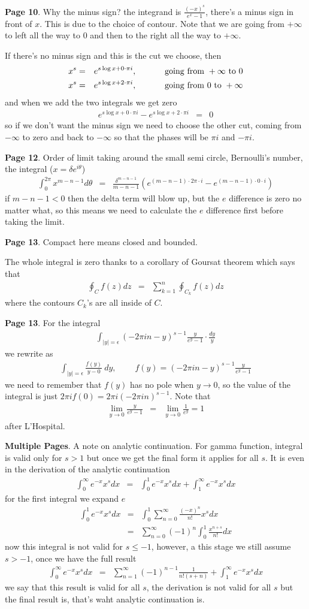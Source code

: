 \documentclass[aps,preprint,preprintnumbers,nofootinbib,showpacs,prd]{revtex4-1}
\newcommand{\nbea}{\begin{eqnarray*}}
\newcommand{\neea}{\end{eqnarray*}}
\begin{document}
{\bf Page 10}. Why the minus sign? the integrand is $\frac{(-x)^s}{e^x - 1}$, there's a minus sign in front of $x$. This is due to the choice of contour. Note that we are going from $+\infty$ to left all the way to 0 and then to the right all the way to $+\infty$.

If there's no minus sign and this is the cut we choose, then
%
\nbea
x^s & = & e^{s\log x + 0\cdot\pi i} , ~~~~~~~~~~ {\rm going~from~} +\infty {\rm ~to~} 0 \\
x^s & = & e^{s\log x + 2\cdot\pi i} , ~~~~~~~~~~ {\rm going~from~} 0 {\rm ~to~} +\infty
\neea
% 
and when we add the two integrals we get zero
%
\nbea
e^{s\log x + 0\cdot\pi i} - e^{s\log x + 2\cdot\pi i} & = & 0
\neea
%
so if we don't want the minus sign we need to choose the other cut, coming from $-\infty$ to zero and back to $-\infty$ so that the phases will be $\pi i$ and $-\pi i$.

{\bf Page 12}. Order of limit taking around the small semi circle, Bernoulli's number, the integral ($x = \delta e^{i\theta}$)
%
\nbea
\int_0^{2\pi} x^{m-n-1} d\theta & = & \frac{\delta^{m-n-1}}{m-n-1} (e^{(m-n-1) \cdot 2\pi \cdot i} - e^{(m-n-1) \cdot 0 \cdot i})
\neea
%
if $m-n-1 < 0$ then the delta term will blow up, but the $e$ difference is zero no matter what, so this means we need to calculate the $e$ difference first before taking the limit.

{\bf Page 13}. Compact here means closed and bounded.

The whole integral is zero thanks to a corollary of Goursat theorem which says that
%
\nbea
\oint_C f(z) dz & = & \sum_{k=1}^n \oint_{C_k} f(z) dz
\neea
%
where the contours $C_k$'s are all inside of $C$.

{\bf Page 13}. For the integral
%
\nbea
\int_{|y|=\epsilon} (-2\pi i n - y)^{s-1} \frac{y}{e^y - 1} \cdot \frac{dy}{y}
\neea
%
we rewrite as
%
\nbea
\int_{|y|=\epsilon} \frac{f(y)}{y - 0} ~ dy, ~~~~~~~~~~ f(y) = (-2\pi i n - y)^{s-1} \frac{y}{e^y - 1}
\neea
%
we need to remember that $f(y)$ has no pole when $y\to 0$, so the value of the integral is just $2\pi i f(0) = 2\pi i(-2\pi i n)^{s-1}$. Note that
%
\nbea
\lim_{y\to0} \frac{y}{e^y - 1} & = & \lim_{y\to0} \frac{1}{e^y} = 1
\neea
%
after L'Hospital.

{\bf Multiple Pages}. A note on analytic continuation. For gamma function, integral is valid only for $s > 1$ but once we get the final form it applies for all $s$. It is even in the derivation of the analytic continuation
%
\nbea
\int_0^\infty e^{-x} x^{s} dx & = & \int_0^1 e^{-x} x^{s} dx + \int_1^\infty e^{-x} x^{s} dx
\neea
%
for the first integral we expand $e$
%
\nbea
\int_0^1 e^{-x} x^{s} dx & = & \int_0^1 \sum_{n=0}^\infty \frac{(-x)^n}{n!} x^{s} dx \\
& = & \sum_{n=0}^\infty (-1)^{n} \int_0^1  \frac{x^{n+s}}{n!} dx
\neea
%
now this integral is not valid for $s \le -1$, however, a this stage we still assume $s > -1$, once we have the full result
%
\nbea
\int_0^\infty e^{-x} x^{s} dx & = & \sum_{n=1}^\infty (-1)^{n-1} \frac{1}{n!(s+n)} + \int_1^\infty e^{-x} x^{s} dx
\neea
%
we say that this result is valid for all $s$, the derivation is not valid for all $s$ but the final result is, that's waht analytic continuation is.
\end{document}
